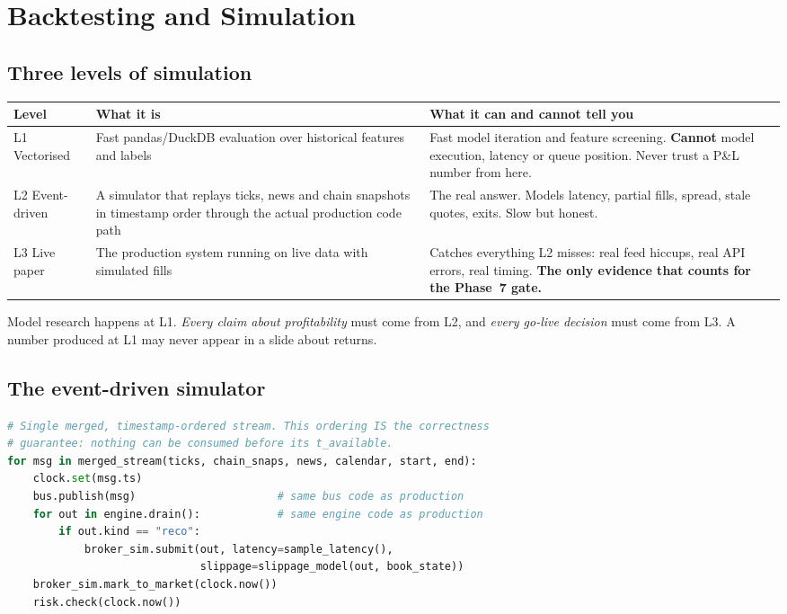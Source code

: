 \chapter{Backtesting and Simulation}
\label{ch:backtest}

\section{Three levels of simulation}

\begin{longtable}{@{}p{2.6cm}p{4.2cm}p{7.8cm}@{}}
\toprule
\textbf{Level} & \textbf{What it is} & \textbf{What it can and cannot tell you}\\
\midrule
L1 Vectorised & Fast pandas/DuckDB evaluation over historical features and
labels & Fast model iteration and feature screening. \textbf{Cannot} model
execution, latency or queue position. Never trust a P\&L number from here.\\
L2 Event-driven & A simulator that replays ticks, news and chain snapshots in
timestamp order through the actual production code path & The real answer.
Models latency, partial fills, spread, stale quotes, exits. Slow but honest.\\
L3 Live paper & The production system running on live data with simulated fills
& Catches everything L2 misses: real feed hiccups, real API errors, real
timing. \textbf{The only evidence that counts for the Phase~7 gate.}\\
\bottomrule
\end{longtable}

\begin{keybox}[title={Rule}]
Model research happens at L1. \emph{Every claim about profitability} must come
from L2, and \emph{every go-live decision} must come from L3. A number produced
at L1 may never appear in a slide about returns.
\end{keybox}

\section{The event-driven simulator}

\begin{lstlisting}[language=Python,caption={Simulator core loop (conceptual)}]
# Single merged, timestamp-ordered stream. This ordering IS the correctness
# guarantee: nothing can be consumed before its t_available.
for msg in merged_stream(ticks, chain_snaps, news, calendar, start, end):
    clock.set(msg.ts)
    bus.publish(msg)                      # same bus code as production
    for out in engine.drain():            # same engine code as production
        if out.kind == "reco":
            broker_sim.submit(out, latency=sample_latency(),
                              slippage=slippage_model(out, book_state))
    broker_sim.mark_to_market(clock.now())
    risk.check(clock.now())
\end{lstlisting}

